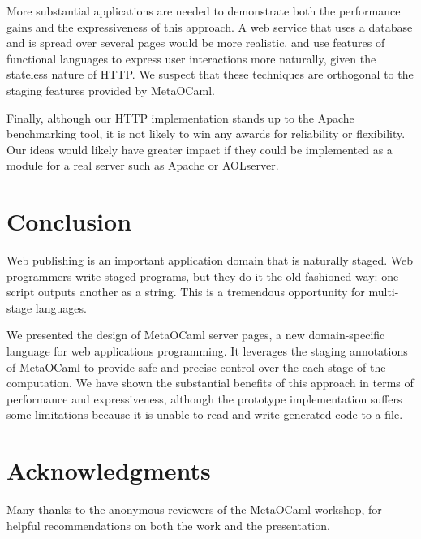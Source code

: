\documentclass[preprint]{acm_proc_article-sp}
\def\MOC{MetaOCaml\xspace}
\begin{document}
More substantial applications are needed to demonstrate both the
performance gains and the expressiveness of this approach.  A web
service that uses a database and is spread over several pages would be
more realistic.  \citet{queinnec00influence} and
\citet{graunke01programming} use features of functional languages to
express user interactions more naturally, given the stateless nature
of HTTP.  We suspect that these techniques are orthogonal to the
staging features provided by \MOC.

Finally, although our HTTP implementation stands up to the Apache
benchmarking tool, it is not likely to win any awards for reliability
or flexibility.  Our ideas would likely have greater impact if they
could be implemented as a module for a real server such as Apache or
AOLserver.


\section{Conclusion}
\label{sec:concl}

Web publishing is an important application domain that is naturally
staged.  Web programmers write staged programs, but they do it the
old-fashioned way: one script outputs another as a string.  This is a
tremendous opportunity for multi-stage languages.

We presented the design of \MOC server pages, a new
domain-specific language for web applications programming.  It
leverages the staging annotations of \MOC to provide safe and
precise control over the each stage of the computation.
We have shown the substantial benefits of this approach in terms
of performance and expressiveness, although the prototype
implementation suffers some limitations because it is unable to
read and write generated code to a file.

\section*{Acknowledgments}

Many thanks to the anonymous reviewers of the \MOC workshop, for
helpful recommendations on both the work and the presentation.


\raggedright

\end{document}
